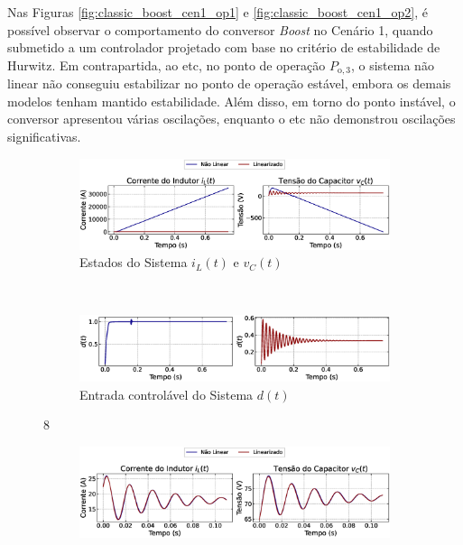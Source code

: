 Nas Figuras \ref{fig:classic_boost_cen1_op1} e \ref{fig:classic_boost_cen1_op2}, é possível observar o comportamento do conversor \textit{Boost }no Cenário 1, quando submetido a um controlador projetado com base no critério de estabilidade de Hurwitz. Em contrapartida, ao \acrshort{etc}, no ponto de operação $P_{\mathrm{o}, 3}$, o sistema não linear não conseguiu estabilizar no ponto de operação estável, embora os demais modelos tenham mantido estabilidade. Além disso, em torno do ponto instável, o conversor apresentou várias oscilações, enquanto o \acrshort{etc} não demonstrou oscilações significativas.

\begin{figure}[H]
  \centering
  \captionsetup{justification=centering}
  \begin{subfigure}{1.\textwidth}
    \centering
    \includegraphics[width=1.\textwidth]{figuras/classic/boost/sim1/op1/result.eps}
    \caption{Estados do Sistema $i_L(t)$  e $v_C(t)$}
  \end{subfigure}
  \\[6pt]
  \begin{subfigure}{1.\textwidth}
    \centering
    \includegraphics[width=1.\textwidth]{figuras/classic/boost/sim1/op1/duty-cycle.eps}
    \caption{Entrada controlável do Sistema $d(t)$}
  \end{subfigure}8
  \caption{Conversor \textit{Boost }no Cenário 1 operando em torno de $P_{\mathrm{o}, 3}$ sob controlador projetado utilizando o critério de estabilidade de Hurwitz.}
  \label{fig:classic_boost_cen1_op1}
  \begin{subfigure}{1.\textwidth}
    \centering
    \includegraphics[width=1.\textwidth]{figuras/classic/boost/sim1/op2/result.eps}

\end{subfigure}
\end{figure}
